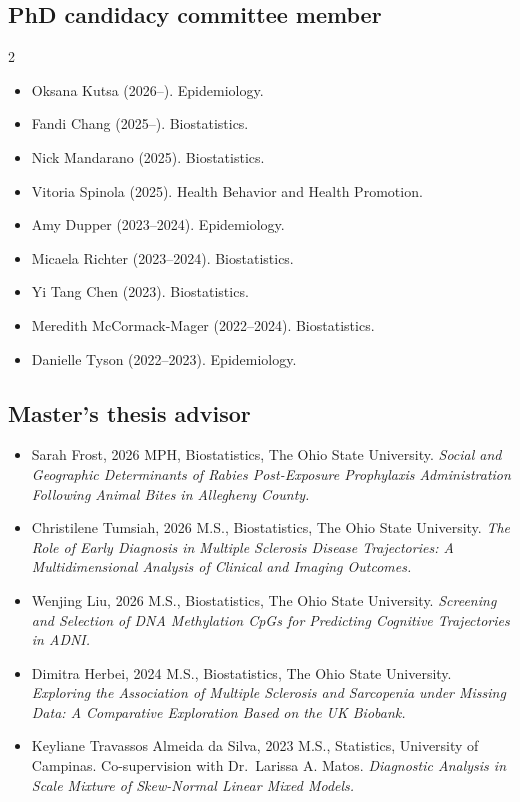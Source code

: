 \documentclass[
  10pt,
  letterpaper,
]{article}
\providecommand{\tightlist}{%
  \setlength{\itemsep}{0pt}\setlength{\parskip}{0pt}}
\begin{document}
\subsection{PhD candidacy committee
member}\label{phd-candidacy-committee-member}

\begin{multicols}{2}\raggedright

\begin{itemize}
\tightlist
\item
  Oksana Kutsa (2026--). Epidemiology.
\item
  Fandi Chang (2025--). Biostatistics.
\item
  Nick Mandarano (2025). Biostatistics.
\item
  Vitoria Spinola (2025). Health Behavior and Health Promotion.
\item
  Amy Dupper (2023--2024). Epidemiology.
\item
  Micaela Richter (2023--2024). Biostatistics.
\item
  Yi Tang Chen (2023). Biostatistics.
\item
  Meredith McCormack-Mager (2022--2024). Biostatistics.
\item
  Danielle Tyson (2022--2023). Epidemiology.
\end{itemize}

\end{multicols}

\subsection{Master's thesis advisor}\label{masters-thesis-advisor}

\begin{itemize}
\tightlist
\item
  Sarah Frost, 2026 MPH, Biostatistics, The Ohio State University.
  \emph{Social and Geographic Determinants of Rabies Post-Exposure
  Prophylaxis Administration Following Animal Bites in Allegheny
  County.}
\item
  Christilene Tumsiah, 2026 M.S., Biostatistics, The Ohio State
  University. \emph{The Role of Early Diagnosis in Multiple Sclerosis
  Disease Trajectories: A Multidimensional Analysis of Clinical and
  Imaging Outcomes.}
\item
  Wenjing Liu, 2026 M.S., Biostatistics, The Ohio State University.
  \emph{Screening and Selection of DNA Methylation CpGs for Predicting
  Cognitive Trajectories in ADNI.}
\item
  Dimitra Herbei, 2024 M.S., Biostatistics, The Ohio State University.
  \emph{Exploring the Association of Multiple Sclerosis and Sarcopenia
  under Missing Data: A Comparative Exploration Based on the UK
  Biobank.}
\item
  Keyliane Travassos Almeida da Silva, 2023 M.S., Statistics, University
  of Campinas. Co-supervision with Dr.~Larissa A. Matos.
  \emph{Diagnostic Analysis in Scale Mixture of Skew-Normal Linear Mixed
  Models.}
\end{itemize}
\end{document}

